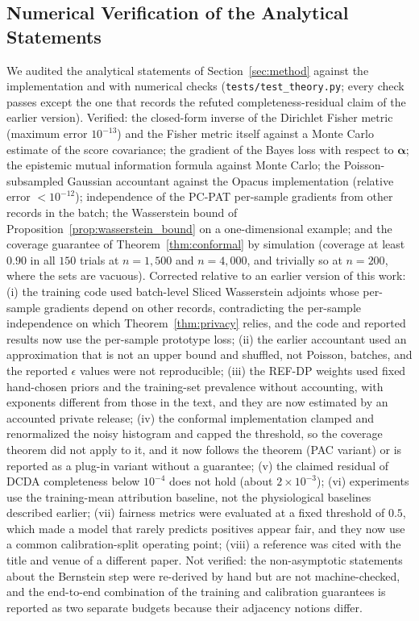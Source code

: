 \documentclass[pdflatex,sn-vancouver-num,referee,lineno]{sn-jnl}
\theoremstyle{thmstyleone}
\theoremstyle{thmstylethree}
\begin{document}
\subsection{Numerical Verification of the Analytical Statements}
\label{sec:verification}
We audited the analytical statements of Section~\ref{sec:method} against the implementation and with numerical checks (\texttt{tests/test\_theory.py}; every check passes except the one that records the refuted completeness-residual claim of the earlier version). Verified: the closed-form inverse of the Dirichlet Fisher metric (maximum error $10^{-13}$) and the Fisher metric itself against a Monte Carlo estimate of the score covariance; the gradient of the Bayes loss with respect to $\boldsymbol{\alpha}$; the epistemic mutual information formula against Monte Carlo; the Poisson-subsampled Gaussian accountant against the Opacus implementation (relative error $<10^{-12}$); independence of the PC-PAT per-sample gradients from other records in the batch; the Wasserstein bound of Proposition~\ref{prop:wasserstein_bound} on a one-dimensional example; and the coverage guarantee of Theorem~\ref{thm:conformal} by simulation (coverage at least $0.90$ in all $150$ trials at $n=1{,}500$ and $n=4{,}000$, and trivially so at $n=200$, where the sets are vacuous). Corrected relative to an earlier version of this work: (i) the training code used batch-level Sliced Wasserstein adjoints whose per-sample gradients depend on other records, contradicting the per-sample independence on which Theorem~\ref{thm:privacy} relies, and the code and reported results now use the per-sample prototype loss; (ii) the earlier accountant used an approximation that is not an upper bound and shuffled, not Poisson, batches, and the reported $\epsilon$ values were not reproducible; (iii) the REF-DP weights used fixed hand-chosen priors and the training-set prevalence without accounting, with exponents different from those in the text, and they are now estimated by an accounted private release; (iv) the conformal implementation clamped and renormalized the noisy histogram and capped the threshold, so the coverage theorem did not apply to it, and it now follows the theorem (PAC variant) or is reported as a plug-in variant without a guarantee; (v) the claimed residual of DCDA completeness below $10^{-4}$ does not hold (about $2\times 10^{-3}$); (vi) experiments use the training-mean attribution baseline, not the physiological baselines described earlier; (vii) fairness metrics were evaluated at a fixed threshold of $0.5$, which made a model that rarely predicts positives appear fair, and they now use a common calibration-split operating point; (viii) a reference was cited with the title and venue of a different paper. Not verified: the non-asymptotic statements about the Bernstein step were re-derived by hand but are not machine-checked, and the end-to-end combination of the training and calibration guarantees is reported as two separate budgets because their adjacency notions differ.
\end{document}
